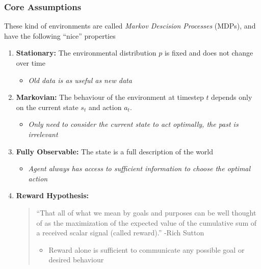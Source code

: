 \documentclass[10pt,a4paper]{beamer}
\begin{document}
\begin{frame}
\frametitle{Core Assumptions}

These kind of environments are called \textit{Markov Descision Processes} (MDPs),
and have the following ``nice'' properties
\begin{enumerate}
	\pause
		\item \textbf{Stationary:} The environmental distribution $p$
		is fixed and does not change over time
		\begin{itemize}
			\item \textit{Old data is as useful as new data}
		\end{itemize}
		\pause
		\item \textbf{Markovian:} The behaviour of the environment
		at timestep $t$ depends only on the current state $s_t$
		and action $a_t$. 
		\begin{itemize}
			\item \textit{Only need to consider the current state to act optimally,
			the past is irrelevant}
		\end{itemize}
	\pause
		\item \textbf{Fully Observable:} The state is a full description
		of the world
		\begin{itemize}
			\item \textit{Agent always has access to sufficient information to 
			choose the optimal action}
		\end{itemize}
	\pause
		\item \textbf{Reward Hypothesis:} 
		\begin{quote}
			``That all of what we mean by goals and purposes can be well thought of as
			the maximization of the expected value of the cumulative sum of a received
			scalar signal (called reward).'' -Rich Sutton
			\begin{itemize}
				\item Reward alone is sufficient to communicate any possible goal
				or desired behaviour
			\end{itemize}
		\end{quote}
\end{enumerate}

\end{frame}
\end{document}
